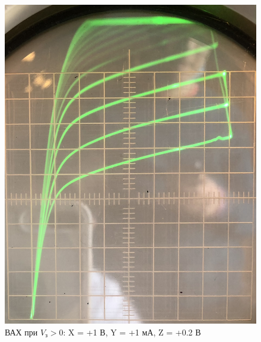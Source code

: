 \documentclass[a4paper]{article}
\begin{document}
\begin{figure}[h]
\begin{center}
\begin{minipage}[h]{0.4\linewidth}
        \includegraphics[width=1\linewidth]{p2.jpg}
        \caption{ВАХ при $V_з > 0$: X = +1 В, Y = +1 мА, Z = +0.2 В}
        \label{p2}
    \end{minipage}
    \end{center}
\end{figure}
\end{document}
